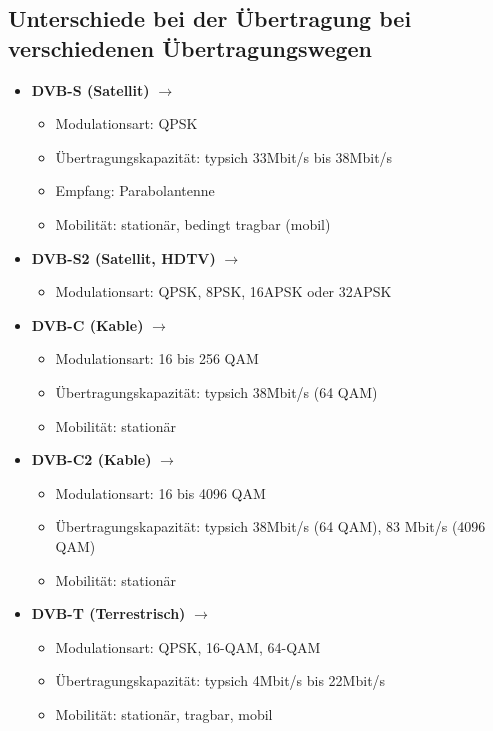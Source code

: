 \documentclass[a4paper]{article}
\begin{document}
\subsection{Unterschiede bei der Übertragung bei verschiedenen Übertragungswegen}

\begin{itemize}

	\item \textbf{DVB-S (Satellit)} $\rightarrow$ \begin{itemize}
	\item Modulationsart: QPSK
	\item Übertragungskapazität: typsich 33Mbit/s bis 38Mbit/s
	\item Empfang: Parabolantenne 
	\item Mobilität: stationär, bedingt tragbar (mobil)
	\end{itemize}
	
	\item \textbf{DVB-S2 (Satellit, HDTV)} $\rightarrow$ \begin{itemize}
	\item Modulationsart: QPSK, 8PSK, 16APSK oder 32APSK
	\end{itemize}	
	
	\item \textbf{DVB-C (Kable)} $\rightarrow$ \begin{itemize}
	\item Modulationsart: 16 bis 256 QAM
	\item Übertragungskapazität: typsich 38Mbit/s (64 QAM)
	\item Mobilität: stationär
	\end{itemize}

	\item \textbf{DVB-C2 (Kable)} $\rightarrow$ \begin{itemize}
	\item Modulationsart: 16 bis 4096 QAM
	\item Übertragungskapazität: typsich 38Mbit/s (64 QAM), 83 Mbit/s (4096 QAM)
	\item Mobilität: stationär
	\end{itemize}
	
	\item \textbf{DVB-T (Terrestrisch)} $\rightarrow$ \begin{itemize}
	\item Modulationsart: QPSK, 16-QAM, 64-QAM
	\item Übertragungskapazität: typsich 4Mbit/s bis 22Mbit/s
	\item Mobilität: stationär, tragbar, mobil
	\end{itemize}



\end{itemize}
\end{document}
